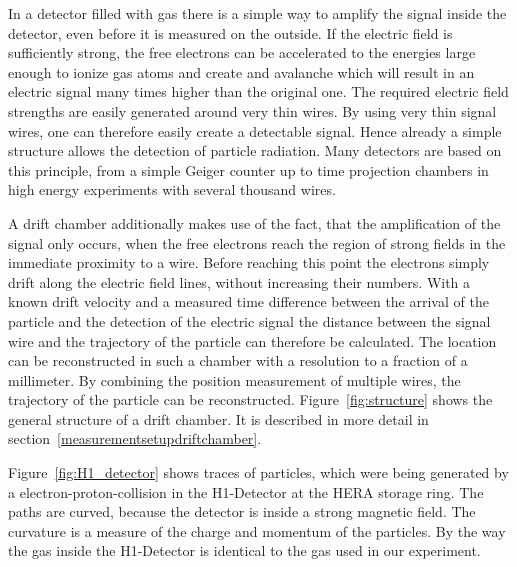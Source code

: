 \documentclass[12pt]{article}
\begin{document}
In a detector filled with gas there is a simple way to amplify the signal inside the detector, even before it is measured on the outside. If the electric field is sufficiently strong, the free electrons can be accelerated to the energies large enough to ionize gas atoms and create and avalanche which will result in an electric signal many times higher than the original one. The required electric field strengths are easily generated around very thin wires. By using very thin signal wires, one can therefore easily create a detectable signal. Hence already a simple structure allows the detection of particle radiation. Many detectors are based on this principle, from a simple Geiger counter up to time projection chambers in high energy experiments with several thousand wires. 

A drift chamber additionally makes  use of the fact, that the amplification of the signal only occurs, when the free electrons reach the region of strong fields in the immediate proximity to a wire. Before reaching this point the electrons simply drift along the electric field lines, without increasing their numbers. With a known drift velocity and a measured time difference between the arrival of the particle and the detection of the electric signal the distance between the signal wire and the trajectory of the particle can therefore be calculated. The location can be reconstructed in such a chamber with a resolution to a fraction of a millimeter. By combining the position measurement of multiple wires, the trajectory of the particle can be reconstructed. Figure~\ref{fig:structure} shows the general structure of a drift chamber. It is described in more detail in section~\ref{measurementsetupdriftchamber}.


Figure~\ref{fig:H1_detector} shows traces of particles, which were being generated by a electron-proton-collision in the H1-Detector at the HERA storage ring. The paths are curved, because the detector is inside a strong magnetic field. The curvature is a measure of the charge and momentum of the particles. By the way the gas inside the H1-Detector is identical to the gas used in our experiment. 
\end{document}
